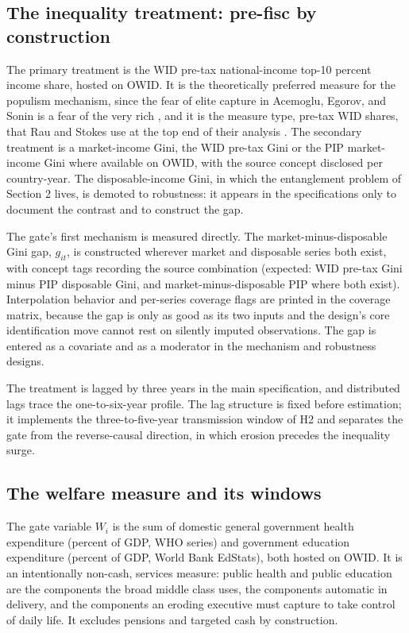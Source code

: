 \subsection{The inequality treatment: pre-fisc by construction}

The primary treatment is the WID pre-tax national-income top-10 percent income share, hosted on OWID. It is the theoretically preferred measure for the populism mechanism, since the fear of elite capture in Acemoglu, Egorov, and Sonin is a fear of the very rich \citep{AcemogluEgorov2013}, and it is the measure type, pre-tax WID shares, that Rau and Stokes use at the top end of their analysis \citep{RauStokes2025}. The secondary treatment is a market-income Gini, the WID pre-tax Gini or the PIP market-income Gini where available on OWID, with the source concept disclosed per country-year. The disposable-income Gini, in which the entanglement problem of Section 2 lives, is demoted to robustness: it appears in the specifications only to document the contrast and to construct the gap.

The gate's first mechanism is measured directly. The market-minus-disposable Gini gap, $g_{it}$, is constructed wherever market and disposable series both exist, with concept tags recording the source combination (expected: WID pre-tax Gini minus PIP disposable Gini, and market-minus-disposable PIP where both exist). Interpolation behavior and per-series coverage flags are printed in the coverage matrix, because the gap is only as good as its two inputs and the design's core identification move cannot rest on silently imputed observations. The gap is entered as a covariate and as a moderator in the mechanism and robustness designs.

The treatment is lagged by three years in the main specification, and distributed lags trace the one-to-six-year profile. The lag structure is fixed before estimation; it implements the three-to-five-year transmission window of H2 and separates the gate from the reverse-causal direction, in which erosion precedes the inequality surge.

\subsection{The welfare measure and its windows}

The gate variable $W_i$ is the sum of domestic general government health expenditure (percent of GDP, WHO series) and government education expenditure (percent of GDP, World Bank EdStats), both hosted on OWID. It is an intentionally non-cash, services measure: public health and public education are the components the broad middle class uses, the components automatic in delivery, and the components an eroding executive must capture to take control of daily life. It excludes pensions and targeted cash by construction.

